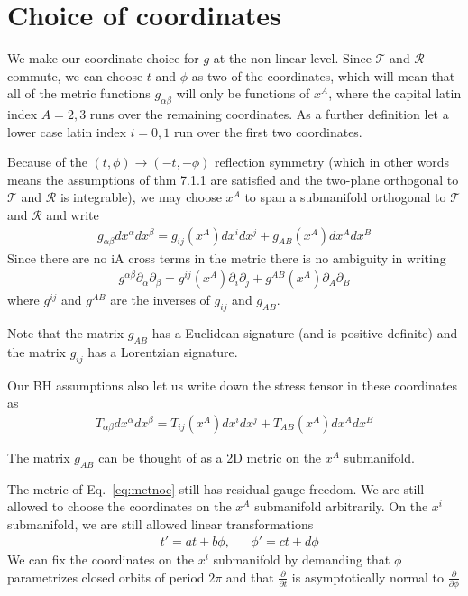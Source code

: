 \documentclass[aps,prd,amsmath,showpacs,amssymb,superscriptaddress,nofootinbib,longbibliography,eqsecnum,preprintnumbers]{revtex4-1}
\begin{document}
\section{Choice of coordinates}
\label{sec:coord}

We make our coordinate choice for $g$ at the non-linear level. Since $\mathcal{T}$ and $\mathcal{R}$ commute, we can choose $t$ and $\phi$ as two of the coordinates, which will mean that all of the metric functions $g_{\alpha \beta}$ will only be functions of $x^A$, where the capital latin index $A=2,3$ runs over the remaining coordinates. As a further definition let a lower case latin index $i=0,1$ run over the first two coordinates.

Because of the $(t,\phi)\to (-t,-\phi)$ reflection symmetry (which in other words means the assumptions of thm 7.1.1 are satisfied and the two-plane orthogonal to $\mathcal{T}$ and $\mathcal{R}$ is integrable), we may choose $x^A$ to span a submanifold orthogonal to $\mathcal{T}$ and $\mathcal{R}$ and write
\begin{align}
g_{\alpha \beta}dx^\alpha dx^\beta=g_{ij}(x^A)dx^{i}dx^j+g_{AB}(x^A)dx^{A}dx^B \label{eq:metnoc}
\end{align}
Since there are no iA cross terms in the metric there is no ambiguity in writing
\begin{align}
g^{\alpha \beta}\partial_\alpha \partial_\beta=g^{ij}(x^A)\partial_i \partial_j+g^{AB}(x^A)\partial_A\partial_B
\end{align}
where $g^{ij}$ and $g^{AB}$ are the inverses of $g_{ij}$ and $g_{AB}$.

Note that the matrix $g_{AB}$ has a Euclidean signature (and is positive definite) and the matrix $g_{ij}$ has a Lorentzian signature. 

Our BH assumptions also let us write down the stress tensor in these coordinates as
\begin{align}
T_{\alpha \beta}dx^\alpha dx^\beta=T_{ij}(x^A)dx^{i}dx^j+T_{AB}(x^A)dx^{A}dx^B
\end{align}

The matrix $g_{AB}$ can be thought of as a 2D metric on the $x^A$ submanifold. 

The metric of Eq.~\eqref{eq:metnoc} still has residual gauge freedom. We are still allowed to choose the coordinates on the $x^A$ submanifold arbitrarily. On the $x^i$ submanifold, we are still allowed linear transformations
\begin{align}
&t'= a t+ b \phi,& & \phi'=c t +d \phi
\end{align}
We can fix the coordinates on the $x^i$ submanifold by demanding that $\phi$ parametrizes closed orbits of period $2\pi$ and that $\frac{\partial}{\partial t}$ is asymptotically normal to $\frac{\partial}{\partial \phi}$
\end{document}
